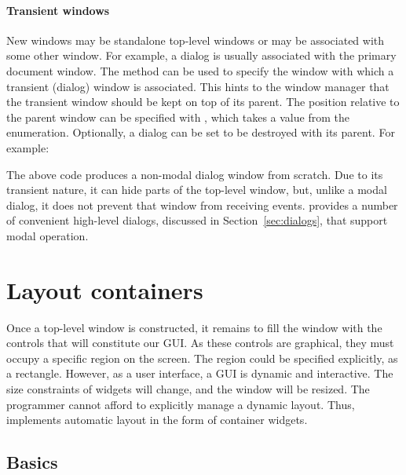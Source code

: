 \paragraph{Transient windows}
New windows may be standalone top-level windows or may be associated
with some other window. For example, a dialog is usually associated
with the primary document window. The
 method can be used to specify the
window with which a transient (dialog) window is associated. This
hints to the window manager that the transient window should be kept on
top of its parent. The position relative to the parent window can be
specified with , which takes a value from the
 enumeration. Optionally, a dialog can be
set to be destroyed with its parent. For example:
\begin{Schunk}
\end{Schunk}
% 
The above code produces a non-modal dialog window from scratch. Due to
its transient nature, it can hide parts of the top-level window, but,
unlike a modal dialog, it does not prevent that window from receiving
events. \GTK\/ provides a number of convenient high-level dialogs,
discussed in Section~\ref{sec:dialogs}, that support modal operation.

\section{Layout containers}
\label{sec:RGtk2:layout}

Once a top-level window is constructed, it remains to fill the window
with the controls that will constitute our GUI. As these controls are
graphical, they must occupy a specific region on the screen. The
region could be specified explicitly, as a rectangle. However, as a
user interface, a GUI is dynamic and interactive. The size constraints
of widgets will change, and the window will be resized. The programmer
cannot afford to explicitly manage a dynamic layout. Thus, \GTK\/
implements automatic layout in the form of container widgets.

\subsection{Basics}
\label{sec:RGtk2:layout:basics}

